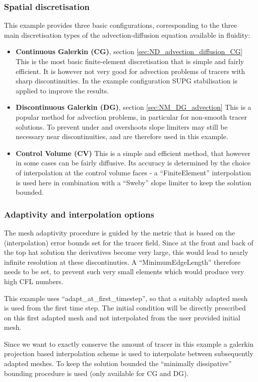\subsubsection{Spatial discretisation}
This example provides three basic configurations, corresponding to
the three main discretisation types of the advection-diffusion equation
available in fluidity:
\begin{itemize}
\item {\bf Continuous Galerkin (CG)}, section \ref{sec:ND_advection_diffusion_CG}
This is the most basic finite-element discretisation that is simple 
and fairly efficient. It is however not very good for advection problems
of tracers with sharp discontinuities. In the example configuration
SUPG stabilisation is applied to improve the results.
\item {\bf Discontinuous Galerkin (DG)}, section \ref{sec:NM_DG_advection}
This is a popular method for advection problems, in particular 
for non-smooth tracer solutions. To prevent under and overshoots
slope limiters may still be necessary near discontinuities, and are
therefore used in this example.
\item {\bf Control Volume (CV)}
This is a simple and efficient method, that however in some cases 
can be fairly diffusive. Its accuracy is determined by the choice 
of interpolation at the control volume faces - a ``FiniteElement''
interpolation is used here in combination with a ``Sweby'' slope 
limiter to keep the solution bounded. 
\end{itemize}

\subsubsection{Adaptivity and interpolation options}
The mesh adaptivity procedure is guided by the metric that is based on
the (interpolation) error bounds set for the tracer field. Since at 
the front and back of the top hat solution the derivatives 
become very large, this would lead to nearly infinite resolution at these
discontinuties. A ``MinimumEdgeLength'' therefore needs to be set, to prevent
such very small elements which would produce very high CFL numbers.

This example uses ``adapt\_at\_first\_timestep'', so that a suitably
adapted mesh is used from the first time step. The initial condition
will be directly prescribed on this first adapted mesh and not interpolated
from the user provided initial mesh.

Since we want to exactly conserve the amount of tracer in this example
a galerkin projection based interpolation scheme is used to interpolate
between subsequently adapted meshes. To keep the solution bounded the
``minimally dissipative'' bounding procedure is used (only available for CG and DG).

